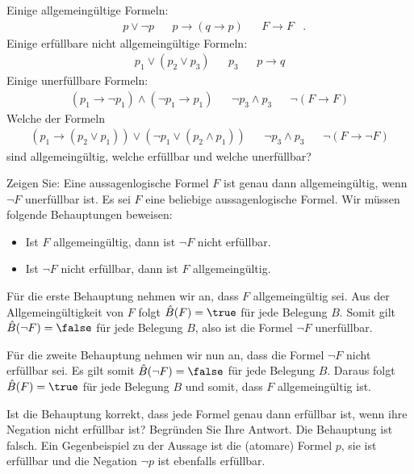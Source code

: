 \begin{example}
    Einige allgemeingültige Formeln:
    \begin{align*}
        &p\lor\neg p& &p\to (q\to p)& &F\to F&.
    \end{align*}
    Einige erfüllbare  nicht allgemeingültige Formeln:
    \begin{align*}
        &p_1\lor (p_2\lor p_3)& &p_3& &p\to q&
    \end{align*}
    Einige unerfüllbare Formeln:
    \begin{align*}
        &(p_1\to\neg p_1)\land(\neg p_1\to p_1)& &\neg p_3\land p_3& &\neg (F\to F)&
    \end{align*}
    Welche der Formeln
    \begin{align*}
        &(p_1\to (p_2\lor p_1))\lor(\neg p_1\lor (p_2\land p_1))& &\neg p_3\land p_3& &\neg (F\to \neg F)&
    \end{align*}
    sind allgemeingültig, welche erfüllbar und welche unerfüllbar?
\end{example}

\begin{example}
    Zeigen Sie: Eine aussagenlogische Formel $F$ ist genau dann allgemeingültig, wenn $\neg F$ unerfüllbar ist.
    \tcblower
    Es sei $F$ eine beliebige aussagenlogische Formel. Wir müssen folgende Behauptungen beweisen:
    \begin{itemize}
        \item Ist $F$ allgemeingültig, dann ist $\neg F$ nicht erfüllbar.
        \item Ist $\neg F$ nicht erfüllbar, dann ist $F$ allgemeingültig.
    \end{itemize}
    Für die erste Behauptung nehmen wir an, dass $F$ allgemeingültig sei. Aus der Allgemeingültigkeit von $F$ folgt $\hat B(F)=\true$ für jede Belegung $B$. Somit gilt $\hat B(\neg F)=\false$ für jede Belegung $B$, also ist die Formel $\neg F$ unerfüllbar.

    Für die zweite Behauptung nehmen wir nun an, dass die Formel $\neg F$ nicht erfüllbar sei. Es gilt somit $\hat B(\neg F)=\false$ für jede Belegung $B$. Daraus folgt $\hat B(F)=\true$ für jede Belegung $B$ und somit, dass $F$ allgemeingültig ist.
\end{example}

\begin{example}
    Ist die Behauptung korrekt, dass jede Formel genau dann erfüllbar ist, wenn ihre Negation nicht erfüllbar ist? Begründen Sie Ihre Antwort.
    \tcblower
    Die Behauptung ist falsch. Ein Gegenbeispiel zu der Aussage ist die (atomare) Formel $p$, sie ist erfüllbar und die Negation $\neg p$ ist ebenfalls erfüllbar.
\end{example}

